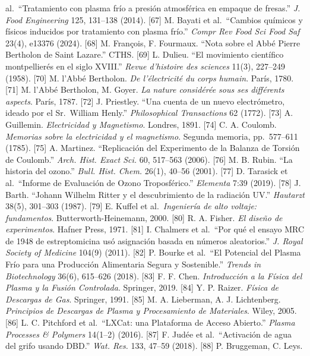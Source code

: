 \documentclass[
  10pt,
  letterpaper,
  twocolumn]{article}
\begin{document}
al.~``Tratamiento con plasma frío a presión atmosférica en empaque de
fresas.'' \emph{J. Food Engineering} 125, 131--138 (2014). {[}67{]} M.
Bayati et al.~``Cambios químicos y físicos inducidos por tratamiento con
plasma frío.'' \emph{Compr Rev Food Sci Food Saf} 23(4), e13376 (2024).
{[}68{]} M. François, F. Fourmaux. ``Nota sobre el Abbé Pierre Bertholon
de Saint Lazare.'' CTHS. {[}69{]} L. Dulieu. ``El movimiento científico
montpellierés en el siglo XVIII.'' \emph{Revue d'histoire des sciences}
11(3), 227--249 (1958). {[}70{]} M. l'Abbé Bertholon. \emph{De
l'électricité du corps humain}. París, 1780. {[}71{]} M. l'Abbé
Bertholon, M. Goyer. \emph{La nature considérée sous ses différents
aspects}. París, 1787. {[}72{]} J. Priestley. ``Una cuenta de un nuevo
electrómetro, ideado por el Sr.~William Henly.'' \emph{Philosophical
Transactions} 62 (1772). {[}73{]} A. Guillemin. \emph{Electricidad y
Magnetismo}. Londres, 1891. {[}74{]} C. A. Coulomb. \emph{Memorias sobre
la electricidad y el magnetismo}. Segunda memoria, pp.~577--611 (1785).
{[}75{]} A. Martinez. ``Replicación del Experimento de la Balanza de
Torsión de Coulomb.'' \emph{Arch. Hist. Exact Sci.} 60, 517--563 (2006).
{[}76{]} M. B. Rubin. ``La historia del ozono.'' \emph{Bull. Hist.
Chem.} 26(1), 40--56 (2001). {[}77{]} D. Tarasick et al.~``Informe de
Evaluación de Ozono Troposférico.'' \emph{Elementa} 7:39 (2019).
{[}78{]} J. Barth. ``Johann Wilhelm Ritter y el descubrimiento de la
radiación UV.'' \emph{Hautarzt} 38(5), 301--303 (1987). {[}79{]} E.
Kuffel et al.~\emph{Ingeniería de alto voltaje: fundamentos}.
Butterworth-Heinemann, 2000. {[}80{]} R. A. Fisher. \emph{El diseño de
experimentos}. Hafner Press, 1971. {[}81{]} I. Chalmers et al.~``Por qué
el ensayo MRC de 1948 de estreptomicina usó asignación basada en números
aleatorios.'' \emph{J. Royal Society of Medicine} 104(9) (2011).
{[}82{]} P. Bourke et al.~``El Potencial del Plasma Frío para una
Producción Alimentaria Segura y Sostenible.'' \emph{Trends in
Biotechnology} 36(6), 615--626 (2018). {[}83{]} F. F. Chen.
\emph{Introducción a la Física del Plasma y la Fusión Controlada}.
Springer, 2019. {[}84{]} Y. P. Raizer. \emph{Física de Descargas de
Gas}. Springer, 1991. {[}85{]} M. A. Lieberman, A. J. Lichtenberg.
\emph{Principios de Descargas de Plasma y Procesamiento de Materiales}.
Wiley, 2005. {[}86{]} L. C. Pitchford et al.~``LXCat: una Plataforma de
Acceso Abierto.'' \emph{Plasma Processes \& Polymers} 14(1--2) (2016).
{[}87{]} F. Judée et al.~``Activación de agua del grifo usando DBD.''
\emph{Wat. Res.} 133, 47--59 (2018). {[}88{]} P. Bruggeman, C. Leys.
\end{document}
